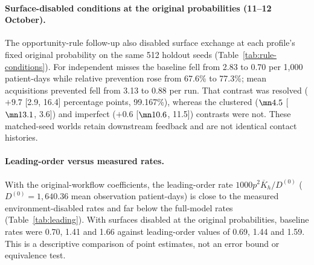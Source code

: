 \paragraph{Surface-disabled conditions at the original probabilities (11--12
October).} The opportunity-rule follow-up also disabled surface exchange at each
profile's fixed original probability on the same 512 holdout seeds
(Table~\ref{tab:rule-conditions}). For independent misses the baseline fell from
2.83 to 0.70 per 1,000 patient-days while relative prevention rose from 67.6\% to
77.3\%; mean acquisitions prevented fell from 3.13 to 0.88 per run. That
contrast was resolved ($+9.7$ [2.9, 16.4] percentage points, 99.167\%), whereas
the clustered ($\mn4.5$ [$\mn13.1$, 3.6]) and imperfect ($+0.6$ [$\mn10.6$,
11.5]) contrasts were not. These matched-seed worlds retain downstream feedback
and are not identical contact histories.

\paragraph{Leading-order versus measured rates.} With the original-workflow
coefficients, the leading-order rate $1000p^2\overline K_h/D^{(0)}$
($D^{(0)}=1{,}640.36$ mean observation patient-days) is close to the measured
environment-disabled rates and far below the full-model rates
(Table~\ref{tab:leading}). With surfaces disabled at the original probabilities,
baseline rates were 0.70, 1.41 and 1.66 against leading-order values of 0.69,
1.44 and 1.59. This is a descriptive comparison of point estimates, not an error
bound or equivalence test.

